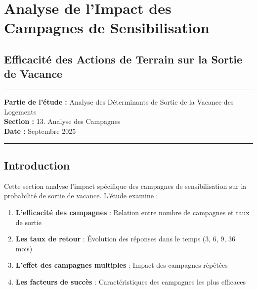 \documentclass[11pt]{article}
\makeatletter
\providecommand{\tightlist}{%
      \setlength{\itemsep}{0pt}\setlength{\parskip}{0pt}}
\newcommand{\boxspacing}{\kern\kvtcb@left@rule\kern\kvtcb@boxsep}
\newcommand{\prompt}[4]{
        {\ttfamily\llap{{\color{#2}[#3]:\hspace{3pt}#4}}\vspace{-\baselineskip}}
    }
\makeatother
\begin{document}
    \begin{tcolorbox}[breakable, size=fbox, boxrule=1pt, pad at break*=1mm,colback=cellbackground, colframe=cellborder]
\prompt{In}{incolor}{ }{\boxspacing}
\begin{Verbatim}[commandchars=\\\{\}]

\end{Verbatim}
\end{tcolorbox}

    \section{Analyse de l'Impact des Campagnes de
Sensibilisation}\label{analyse-de-limpact-des-campagnes-de-sensibilisation}

\subsection{Efficacité des Actions de Terrain sur la Sortie de
Vacance}\label{efficacituxe9-des-actions-de-terrain-sur-la-sortie-de-vacance}

\begin{center}\rule{0.5\linewidth}{0.5pt}\end{center}

\textbf{Partie de l'étude :} Analyse des Déterminants de Sortie de la
Vacance des Logements\\
\textbf{Section :} 13. Analyse des Campagnes\\
\textbf{Date :} Septembre 2025

\begin{center}\rule{0.5\linewidth}{0.5pt}\end{center}

\subsection{Introduction}\label{introduction}

Cette section analyse l'impact spécifique des campagnes de
sensibilisation sur la probabilité de sortie de vacance. L'étude examine
:

\begin{enumerate}
\def\labelenumi{\arabic{enumi}.}
\tightlist
\item
  \textbf{L'efficacité des campagnes} : Relation entre nombre de
  campagnes et taux de sortie
\item
  \textbf{Les taux de retour} : Évolution des réponses dans le temps (3,
  6, 9, 36 mois)
\item
  \textbf{L'effet des campagnes multiples} : Impact des campagnes
  répétées
\item
  \textbf{Les facteurs de succès} : Caractéristiques des campagnes les
  plus efficaces
\end{enumerate}
\end{document}
